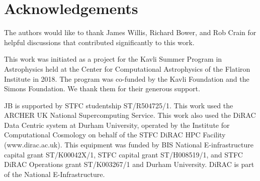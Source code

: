 \section{Acknowledgements}
\label{sec:acknowledgements}

The authors would like to thank James Willis, Richard Bower, and Rob Crain for
helpful discussions that contributed significantly to this work.

This work was initiated as a project for the Kavli Summer Program in
Astrophysics held at the Center for Computational Astrophysics of the
Flatiron Institute in 2018. The program was co-funded by the Kavli Foundation
and the Simons Foundation. We thank them for their generous support.

JB is supported by STFC studentship ST/R504725/1. This work used the ARCHER
UK National Supercomputing Service. This work also used the DiRAC Data
Centric system at Durham University, operated by the Institute for
Computational Cosmology on behalf of the STFC DiRAC HPC Facility
(www.dirac.ac.uk). This equipment was funded by BIS National E-infrastructure
capital grant ST/K00042X/1, STFC capital grant ST/H008519/1, and STFC DiRAC
Operations grant ST/K003267/1 and Durham University. DiRAC is part of the
National E-Infrastructure.